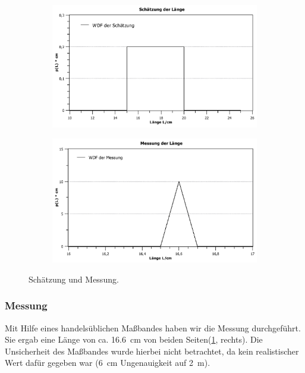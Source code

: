 \documentclass[11pt,a4paper,titlepage, ngerman]{article}
\begin{document}
				\begin{figure}	
					\begin{subfigure}{0.45\textwidth}
						\centering
						\includegraphics[scale=0.3]{Laengenschaetzung.pdf}
					\end{subfigure}
					\begin{subfigure}{0.45\textwidth}
						\centering
						\includegraphics[scale=0.3]{Laengenmessung.pdf}
					\end{subfigure}	
					\caption{Schätzung und Messung.}
					\label{fig:laenge}
				\end{figure}
				
			\subsubsection{Messung}
				\label{2.2.2}
				
				Mit Hilfe eines handelsüblichen Maßbandes haben wir die Messung durchgeführt. Sie ergab eine Länge von ca. \SI{16,6}{\cm} von beiden Seiten(\ref{fig:laenge}, rechts). Die Unsicherheit des Maßbandes wurde hierbei nicht betrachtet, da kein realistischer Wert dafür gegeben war (\SI{6}{\cm} Ungenauigkeit auf \SI{2}{\m}).
			
\end{document}
